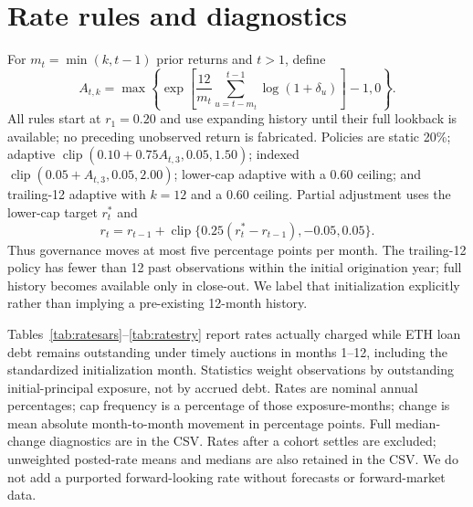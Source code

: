 \documentclass[11pt,a4paper]{article}
\begin{document}
\section{Rate rules and diagnostics}
For $m_t=\min(k,t-1)$ prior returns and $t>1$, define
\begin{equation}
A_{t,k}=\max\left\{\exp\left[\frac{12}{m_t}\sum_{u=t-m_t}^{t-1}\log(1+\delta_u)\right]-1,0\right\}.
\end{equation}
All rules start at $r_1=0.20$ and use expanding history until their full lookback is available; no preceding unobserved return is fabricated. Policies are static 20\%; adaptive $\operatorname{clip}(0.10+0.75A_{t,3},0.05,1.50)$; indexed $\operatorname{clip}(0.05+A_{t,3},0.05,2.00)$; lower-cap adaptive with a 0.60 ceiling; and trailing-12 adaptive with $k=12$ and a 0.60 ceiling. Partial adjustment uses the lower-cap target $r_t^*$ and
\begin{equation}
r_t=r_{t-1}+\operatorname{clip}\{0.25(r_t^*-r_{t-1}),-0.05,0.05\}.
\end{equation}
Thus governance moves at most five percentage points per month. The trailing-12 policy has fewer than 12 past observations within the initial origination year; full history becomes available only in close-out. We label that initialization explicitly rather than implying a pre-existing 12-month history.

Tables~\ref{tab:ratesars}--\ref{tab:ratestry} report rates actually charged while ETH loan debt remains outstanding under timely auctions in months 1--12, including the standardized initialization month. Statistics weight observations by outstanding initial-principal exposure, not by accrued debt. Rates are nominal annual percentages; cap frequency is a percentage of those exposure-months; change is mean absolute month-to-month movement in percentage points. Full median-change diagnostics are in the CSV. Rates after a cohort settles are excluded; unweighted posted-rate means and medians are also retained in the CSV. We do not add a purported forward-looking rate without forecasts or forward-market data.
\begin{table}[H]\centering\small\setlength{\tabcolsep}{4pt}
\caption{ARS rate diagnostics. P90/P99 are distribution percentiles; all policy coefficients are assumptions.}\label{tab:ratesars}\end{table}
\begin{table}[H]\centering\small\setlength{\tabcolsep}{4pt}
\caption{TRY rate diagnostics, with the same units and exposure-month denominator as Table~\ref{tab:ratesars}.}\label{tab:ratestry}\end{table}
\end{document}
